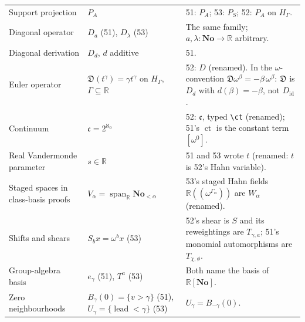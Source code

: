 \documentclass[11pt,letterpaper]{article}
\numberwithin{equation}{section}
\theoremstyle{definition}
\theoremstyle{remark}
\newcommand{\No}{\mathbf{No}}
\newcommand{\R}{\mathbb{R}}
\newcommand{\Span}{\operatorname{span}}
\newcommand{\lead}{\operatorname{lead}}
\newcommand{\id}{\operatorname{id}}
\newcommand{\ct}{\operatorname{ct}}
\newcommand{\cont}{\mathfrak c}%
\newcommand{\EuD}{\mathfrak D}%
\begin{document}
\begin{center}
\begin{longtable}{L{0.27\textwidth}L{0.27\textwidth}L{0.37\textwidth}}
Support projection & \(P_A\) & 51: \(P_A\); 53: \(P_S\); 52: \(P_A\) on \(H_\Gamma\).\\
Diagonal operator & \(D_a\) (51), \(D_\lambda\) (53) & The same family; \(a,\lambda:\No\to\R\) arbitrary.\\
Diagonal derivation & \(D_d\), \(d\) additive & 51.\\
Euler operator & \(\EuD(t^\gamma)=\gamma t^\gamma\) on \(H_\Gamma\), \(\Gamma\subseteq\R\) & 52: \(D\) (renamed).  In the \(\omega\)-convention \(\EuD\omega^\beta=-\beta\,\omega^\beta\): \(\EuD\) is \(D_d\) with \(d(\beta)=-\beta\), not \(D_{\id}\).\\
Continuum & \(\cont=2^{\aleph_0}\) & 52: \(\mathfrak c\), typed \texttt{\textbackslash ct} (renamed); 51's \(\ct\) is the constant term \([\omega^0]\).\\
Real Vandermonde parameter & \(s\in\R\) & 51 and 53 wrote \(t\) (renamed: \(t\) is 52's Hahn variable).\\
Staged spaces in class-basis proofs & \(V_\alpha=\Span_\R\No_{<\alpha}\) & 53's staged Hahn fields \(\R((\omega^{\Gamma_\alpha}))\) are \(W_\alpha\) (renamed).\\
Shifts and shears & \(S_b x=\omega^bx\) (53) & 52's shear is \(S\) and its reweightings are \(T_{\gamma,a}\); 51's monomial automorphisms are \(T_{\chi,\phi}\).\\
Group-algebra basis & \(e_\gamma\) (51), \(T^a\) (53) & Both name the basis of \(\R[\No]\).\\
Zero neighbourhoods & \(B_\gamma(0)=\{v>\gamma\}\) (51), \(U_\gamma=\{\lead<\gamma\}\) (53) & \(U_\gamma=B_{-\gamma}(0)\).\\
\bottomrule
\end{longtable}
\end{center}
\end{document}
